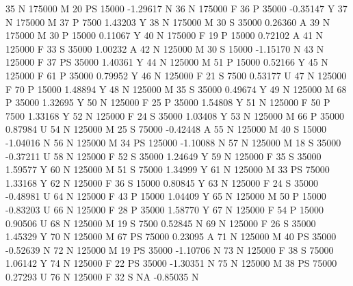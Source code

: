 \documentclass{article}
\begin{document}
\begin{Schunk}
\begin{Soutput}
35        N     175000   M  20        PS  15000  -1.29617    N
36        N     175000   F  36         P  35000  -0.35147    Y
37        N     175000   M  37         P   7500   1.43203    Y
38        N     175000   M  30         S  35000   0.26360    A
39        N     175000   M  30         P  15000   0.11067    Y
40        N     175000   F  19         P  15000   0.72102    A
41        N     125000   F  33         S  35000   1.00232    A
42        N     125000   M  30         S  15000  -1.15170    N
43        N     125000   F  37        PS  35000   1.40361    Y
44        N     125000   M  51         P  15000   0.52166    Y
45        N     125000   F  61         P  35000   0.79952    Y
46        N     125000   F  21         S   7500   0.53177    U
47        N     125000   F  70         P  15000   1.48894    Y
48        N     125000   M  35         S  35000   0.49674    Y
49        N     125000   M  68         P  35000   1.32695    Y
50        N     125000   F  25         P  35000   1.54808    Y
51        N     125000   F  50         P   7500   1.33168    Y
52        N     125000   F  24         S  35000   1.03408    Y
53        N     125000   M  66         P  35000   0.87984    U
54        N     125000   M  25         S  75000  -0.42448    A
55        N     125000   M  40         S  15000  -1.04016    N
56        N     125000   M  34        PS 125000  -1.10088    N
57        N     125000   M  18         S  35000  -0.37211    U
58        N     125000   F  52         S  35000   1.24649    Y
59        N     125000   F  35         S  35000   1.59577    Y
60        N     125000   M  51         S  75000   1.34999    Y
61        N     125000   M  33        PS  75000   1.33168    Y
62        N     125000   F  36         S  15000   0.80845    Y
63        N     125000   F  24         S  35000  -0.48981    U
64        N     125000   F  43         P  15000   1.04409    Y
65        N     125000   M  50         P  15000  -0.83203    U
66        N     125000   F  28         P  35000   1.58770    Y
67        N     125000   F  54         P  15000   0.90506    U
68        N     125000   M  19         S   7500   0.52845    N
69        N     125000   F  26         S  35000   1.45329    Y
70        N     125000   M  67        PS  75000   0.23095    A
71        N     125000   M  40        PS  35000  -0.52639    N
72        N     125000   M  19        PS  35000  -1.10706    N
73        N     125000   F  38         S  75000   1.06142    Y
74        N     125000   F  22        PS  35000  -1.30351    N
75        N     125000   M  38        PS  75000   0.27293    U
76        N     125000   F  32         S     NA  -0.85035    N

\end{Soutput}
\end{Schunk}
\end{document}
